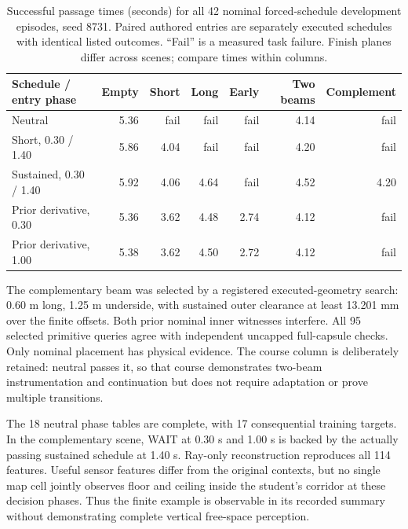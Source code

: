 \documentclass[10pt]{article}
\begin{document}
\begin{table}[t]
\centering\small
\begin{tabular}{lrrrrrr}
\toprule
Schedule / entry phase & Empty & Short & Long & Early & Two beams & Complement \\
\midrule
Neutral & 5.36 & fail & fail & fail & 4.14 & fail \\
Short, 0.30 / 1.40 & 5.86 & 4.04 & fail & fail & 4.20 & fail \\
Sustained, 0.30 / 1.40 & 5.92 & 4.06 & 4.64 & fail & 4.52 & 4.20 \\
Prior derivative, 0.30 & 5.36 & 3.62 & 4.48 & 2.74 & 4.12 & fail \\
Prior derivative, 1.00 & 5.38 & 3.62 & 4.50 & 2.72 & 4.12 & fail \\
\bottomrule
\end{tabular}
\caption{Successful passage times (seconds) for all 42 nominal forced-schedule
development episodes, seed 8731. Paired authored entries are separately executed
schedules with identical listed outcomes. ``Fail'' is a measured task failure.
Finish planes differ across scenes; compare times within columns.}
\label{tab:capability}
\end{table}

The complementary beam was selected by a registered executed-geometry search:
0.60 m long, 1.25 m underside, with sustained outer clearance at least 13.201 mm
over the finite offsets. Both prior nominal inner witnesses interfere. All 95
selected primitive queries agree with independent uncapped full-capsule checks.
Only nominal placement has physical evidence. The course column is deliberately
retained: neutral passes it, so that course demonstrates two-beam instrumentation
and continuation but does not require adaptation or prove multiple transitions.

The 18 neutral phase tables are complete, with 17 consequential training targets.
In the complementary scene, WAIT at 0.30 s and 1.00 s is backed by the actually
passing sustained schedule at 1.40 s. Ray-only reconstruction reproduces all
114 features. Useful sensor features differ from the original contexts, but no
single map cell jointly observes floor and ceiling inside the student's corridor
at these decision phases. Thus the finite example is observable in its recorded
summary without demonstrating complete vertical free-space perception.
\end{document}
